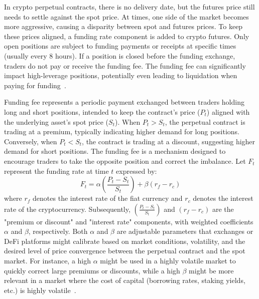 In crypto perpetual contracts, there is no delivery date, but the futures price still needs to settle against the spot price. At times, one side of the market becomes more aggressive, causing a disparity between spot and futures prices. To keep these prices aligned, a funding rate component is added to crypto futures. Only open positions are subject to funding payments or receipts at specific times (usually every 8 hours). If a position is closed before the funding exchange, traders do not pay or receive the funding fee. The funding fee can significantly impact high-leverage positions, potentially even leading to liquidation when paying for funding~\cite{Poloniex_FundingFee}.

Funding fee represents a periodic payment exchanged between traders holding long and short positions, intended to keep the contract's price (\(P_t\)) aligned with the underlying asset's spot price (\(S_t\)). When \(P_t > S_t\), the perpetual contract is trading at a premium, typically indicating higher demand for long positions. Conversely, when \(P_t < S_t\), the contract is trading at a discount, suggesting higher demand for short positions. The funding fee is a mechanism designed to encourage traders to take the opposite position and correct the imbalance. Let \(F_t\) represent the funding rate at time \(t\) expressed by:
\begin{equation}\label{eq:funding1}
	F_t = \alpha \left( \frac{P_t - S_t}{S_t} \right) + \beta \left( r_f - r_c \right)
\end{equation}
where \( r_f \) denotes the interest rate of the fiat currency and \( r_c \) denotes the interest rate of the cryptocurrency. Subsequently, \((\frac{P_t - S_t}{S_t})\) and \((r_f - r_c)\) are the "premium or discount" and "interest rate" components, with weighted coefficients \( \alpha \) and \( \beta \), respectively. Both \( \alpha \) and \( \beta \) are adjustable parameters that exchanges or DeFi platforms might calibrate based on market conditions, volatility, and the desired level of price convergence between the perpetual contract and the spot market. For instance, a high \( \alpha \) might be used in a highly volatile market to quickly correct large premiums or discounts, while a high \( \beta \) might be more relevant in a market where the cost of capital (borrowing rates, staking yields, etc.) is highly volatile~\cite{Binance_Funding,BitMEX_Funding}.

